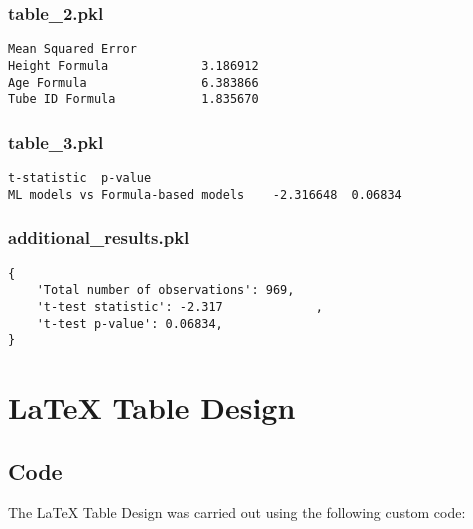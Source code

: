 \documentclass[11pt]{article}
\begin{document}
\subsubsection*{table\_2.pkl}

\begin{Verbatim}[tabsize=4]
                 Mean Squared Error
Height Formula             3.186912
Age Formula                6.383866
Tube ID Formula            1.835670
\end{Verbatim}

\subsubsection*{table\_3.pkl}

\begin{Verbatim}[tabsize=4]
                                   t-statistic  p-value
ML models vs Formula-based models    -2.316648  0.06834
\end{Verbatim}

\subsubsection*{additional\_results.pkl}

\begin{Verbatim}[tabsize=4]
{
    'Total number of observations': 969,
    't-test statistic': -2.317             ,
    't-test p-value': 0.06834,
}
\end{Verbatim}

\section{LaTeX Table Design}
\subsection{{Code}}
The LaTeX Table Design was carried out using the following custom code:
\end{document}
